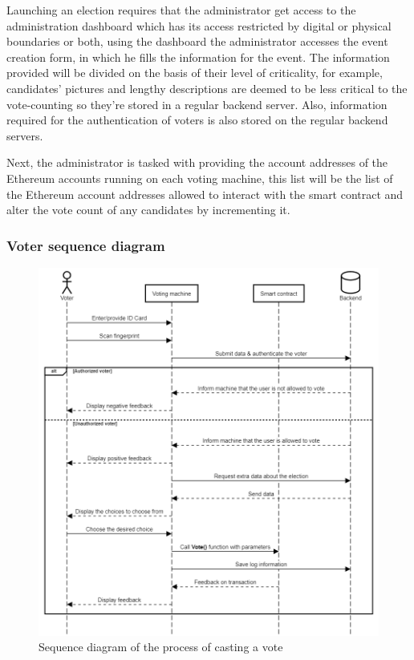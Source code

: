 Launching an election requires that the administrator get access to the administration dashboard which has its access restricted by digital or physical boundaries or both, using the dashboard the administrator accesses the event creation form, in which he fills the information for the event. The information provided will be divided on the basis of their level of criticality, for example, candidates' pictures and lengthy descriptions are deemed to be less critical to the vote-counting so they're stored in a regular backend server. Also, information required for the authentication of voters is also stored on the regular backend servers.

Next, the administrator is tasked with providing the account addresses of the Ethereum accounts running on each voting machine, this list will be the list of the Ethereum account addresses allowed to interact with the smart contract and alter the vote count of any candidates by incrementing it.

\subsubsection{Voter sequence diagram}

\begin{figure}[H]
	\centering
		\includegraphics[width=14cm]{images/chapter3/voter_sequence_diagram.png}
		\caption{{\footnotesize Sequence diagram of the process of casting a vote}}
\end{figure}

